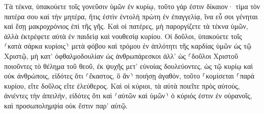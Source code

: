 \documentclass{openreader}
\begin{document}
Τὰ τέκνα, ὑπακούετε τοῖς γονεῦσιν ὑμῶν ἐν κυρίῳ, τοῦτο γάρ ἐστιν δίκαιον· 
τίμα τὸν πατέρα σου καὶ τὴν μητέρα, ἥτις ἐστὶν ἐντολὴ πρώτη ἐν ἐπαγγελίᾳ, 
ἵνα εὖ σοι γένηται καὶ ἔσῃ μακροχρόνιος ἐπὶ τῆς γῆς. 
Καὶ οἱ πατέρες, μὴ παροργίζετε τὰ τέκνα ὑμῶν, ἀλλὰ ἐκτρέφετε αὐτὰ ἐν παιδείᾳ καὶ νουθεσίᾳ κυρίου. 
Οἱ δοῦλοι, ὑπακούετε τοῖς ⸂κατὰ σάρκα κυρίοις⸃ μετὰ φόβου καὶ τρόμου ἐν ἁπλότητι τῆς καρδίας ὑμῶν ὡς τῷ Χριστῷ, 
μὴ κατ’ ὀφθαλμοδουλίαν ὡς ἀνθρωπάρεσκοι ἀλλ’ ὡς ⸀δοῦλοι Χριστοῦ ποιοῦντες τὸ θέλημα τοῦ θεοῦ, ἐκ ψυχῆς 
μετ’ εὐνοίας δουλεύοντες, ὡς τῷ κυρίῳ καὶ οὐκ ἀνθρώποις, 
εἰδότες ὅτι ⸂ἕκαστος, ὃ ἂν⸃ ποιήσῃ ἀγαθόν, τοῦτο ⸀κομίσεται ⸀παρὰ κυρίου, εἴτε δοῦλος εἴτε ἐλεύθερος. 
Καὶ οἱ κύριοι, τὰ αὐτὰ ποιεῖτε πρὸς αὐτούς, ἀνιέντες τὴν ἀπειλήν, εἰδότες ὅτι καὶ ⸂αὐτῶν καὶ ὑμῶν⸃ ὁ κύριός ἐστιν ἐν οὐρανοῖς, καὶ προσωπολημψία οὐκ ἔστιν παρ’ αὐτῷ. 
\end{document}
